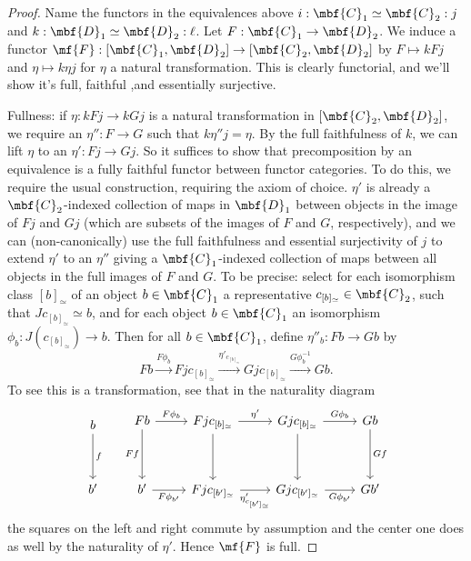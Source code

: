 \begin{proof}
Name the functors in the equivalences above \(i : \mbf{C}_1 \simeq \mbf{C}_2 : j\) and \(k : \mbf{D}_1 \simeq \mbf{D}_2 : \ell\). Let \(F : \mbf{C}_1 \to \mbf{D}_2\). We induce a functor \(\mf{F} : [\mbf{C}_1, \mbf{D}_2] \to [\mbf{C}_2, \mbf{D}_2]\) by \(F \mapsto kFj\) and \(\eta \mapsto k \eta j \) for \(\eta\) a natural transformation. This is clearly functorial, and we'll show it's full, faithful ,and essentially surjective.

Fullness: if \(\eta : kFj \to kGj\) is a natural transformation in \([\mbf{C}_2, \mbf{D}_2]\), we require an \(\eta'' : F \to G\) such that \(k\eta''j = \eta\). By the full faithfulness of \(k\), we can lift \(\eta\) to an \(\eta' : Fj \to Gj\). So it suffices to show that precomposition by an equivalence is a fully faithful functor between functor categories. To do this, we require the usual construction, requiring the axiom of choice. \(\eta'\) is already a \(\mbf{C}_2\)-indexed collection of maps in \(\mbf{D}_1\) between objects in the image of \(Fj\) and \(Gj\) (which are subsets of the images of \(F\) and \(G\), respectively), and we can (non-canonically) use the full faithfulness and essential surjectivity of \(j\) to extend \(\eta'\) to an \(\eta''\) giving a \(\mbf{C}_1\)-indexed collection of maps between all objects in the full images of \(F\) and \(G\). To be precise: select for each isomorphism class \([b]_{\simeq}\) of an object \(b \in \mbf{C}_1\) a representative \(c_{[b]_{\simeq}} \in \mbf{C}_2\), such that \(Jc_{[b]_{\simeq}} \simeq b\), and for each object \(b \in \mbf{C}_1\) an isomorphism \(\phi_b : J(c_{[b]_{\simeq}}) \to b\). Then for all \(b \in \mbf{C}_1\), define \(\eta''_b : Fb \to Gb\) by \[Fb \overset{F \phi_b}{\to} Fjc_{[b]_{\simeq}} \overset{\eta'_{c_{[b]_{\simeq}}}}{\to} Gj c_{[b]_{\simeq}} \overset{G \phi^{-1}_b}{\to} Gb.\] To see this is a transformation, see that in the naturality diagram
\[
\begin{tikzcd}[ampersand replacement = \&]
b \arrow{dd}{f}\\
\\
b'
\end{tikzcd} \hspace{5mm} \begin{tikzcd}[ampersand replacement = \&]
Fb \arrow{r}{F \phi_b} \arrow[swap]{dd}{Ff} \& F jc_{[b]_{\simeq}}  \arrow{r}{\eta'} \arrow{dd}\& Gj c_{[b]_{\simeq}} \arrow{dd} \arrow{r}{G \phi_b} \& Gb \arrow{dd}{Gf} \\
\& \& \& \\
b' \arrow[swap]{r}{F \phi_{b'}} \& Fj c_{[b']_{\simeq}} \arrow[swap]{r}{\eta'_{c_{[b']_{\simeq}}}} \& Gj c_{[b']_{\simeq}} \arrow[swap]{r}{G \phi_{b'}} \& Gb' 
\end{tikzcd}
\]
the squares on the left and right commute by assumption and the center one does as well by the naturality of \(\eta'\). Hence \(\mf{F}\) is full.


\end{proof}
